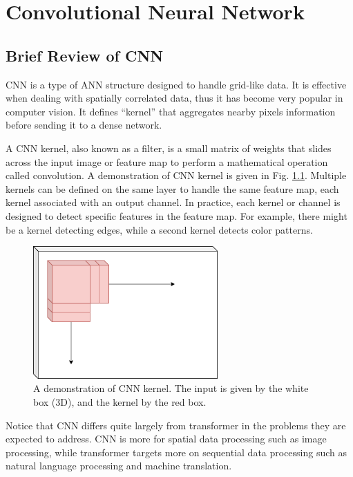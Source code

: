 \chapter{Convolutional Neural Network}

\section{Brief Review of CNN}

CNN is a type of ANN structure designed to handle grid-like data. It is effective when dealing with spatially correlated data, thus it has become very popular in computer vision. It defines ``kernel'' that aggregates nearby pixels information before sending it to a dense network.

A CNN kernel, also known as a filter, is a small matrix of weights that slides across the input image or feature map to perform a mathematical operation called convolution. A demonstration of CNN kernel is given in Fig. \ref{ch:cnn:fig:cnn_kernel}. Multiple kernels can be defined on the same layer to handle the same feature map, each kernel associated with an output channel. In practice, each kernel or channel is designed to detect specific features in the feature map. For example, there might be a kernel detecting edges, while a second kernel detects color patterns.

\begin{figure}
	\centering
	\includegraphics[width=200pt]{chapters/part-5/figures/cnn_general.png}
	\caption{A demonstration of CNN kernel. The input is given by the white box (3D), and the kernel by the red box.} \label{ch:cnn:fig:cnn_kernel}
\end{figure}

Notice that CNN differs quite largely from transformer in the problems they are expected to address. CNN is more for spatial data processing such as image processing, while transformer targets more on sequential data processing such as natural language processing and machine translation. 